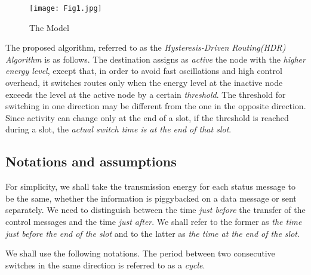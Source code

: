 \documentclass[12 pt]{article}
\newcommand{\debug}[1]{\mbox{\tt #1}}
\renewcommand{\debug}[1]{}              \newcommand{\cmd}[1]{}
\newcommand{\2}{\>\>}
\newcommand{\3}{\>\>\>}
\newcommand{\4}{\>\>\>\>}
\newcommand{\5}{\>\>\>\>\>}
\newcommand{\6}{\>\>\>\>\>\>}
\newcommand{\7}{\6\>}
\newcommand{\8}{\6\2}
\newcommand{\dlabelx}[1]{\debug{\fbox{\tiny #1}}\label{#1}}
\newcommand{\msubsection}[2]{\subsection[#1 \debug{\fbox {#2}}]
	{#1 \cmd{msubsection} \dlabelx{#2}}\markboth{\today}{Sec. \thesection}}
\begin{document}
\begin{figure}[hbtp]
\begin{center}
\texttt{[image: Fig1.jpg]}
\caption{The Model\debug{\fbox{fig-Model}}\label{fig-Model}}
\end{center}
\end{figure}

The proposed algorithm, referred to as the \emph{Hysteresis-Driven Routing(HDR) Algorithm} is as follows.  The destination assigns as \emph{active} the node with the \emph{higher energy level}, except that, in order to avoid fast oscillations and high control overhead, it switches routes only when the energy level at the inactive node exceeds the level at the active node by a certain \emph{threshold}.  The threshold for switching in one direction may be different from the one in the opposite direction.  Since activity can change only at the end of a slot, if the threshold is reached during a slot, the \emph{actual switch time is at the end of that slot}.

\msubsection{Notations and assumptions}{notations}

For simplicity, we shall take the transmission energy for each status message to be the same, whether the information is piggybacked on a data message or sent separately.  We need to distinguish between the time \emph{just before} the transfer of the control messages and the time \emph{just after}.  We shall refer to the former as \emph{the time just before the end of the slot} and to the latter as \emph{the time at the end of the slot}.


We shall use the following notations.  The period between two consecutive switches in the same direction is referred to as a \emph{cycle}.
\end{document}
